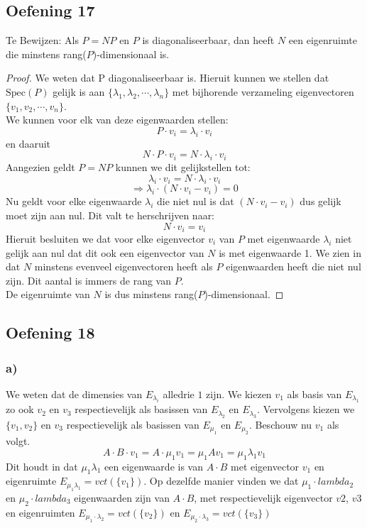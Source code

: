 \documentclass[lineaire_algebra_oplossingen.tex]{subfiles}
\begin{document}
\subsection{Oefening 17}

Te Bewijzen:
Als $P = NP$ en $P$ is diagonaliseerbaar, dan heeft $N$ een eigenruimte die minstens rang($P$)-dimensionaal is.
\begin{proof}
We weten dat P diagonaliseerbaar is. Hieruit kunnen we stellen dat $\text{Spec}(P)$ gelijk is aan $\{\lambda_1, \lambda_2,\cdots,\lambda_n\}$ met bijhorende verzameling eigenvectoren $\{v_1, v_2,\cdots,v_n\}$.\\
We kunnen voor elk van deze eigenwaarden stellen:
\[P \cdot v_i = \lambda_i \cdot v_i\]
en daaruit
\[N \cdot P \cdot v_i = N \cdot \lambda_i \cdot v_i\]
Aangezien geldt $P=NP$ kunnen we dit gelijkstellen tot:
\[\lambda_i \cdot v_i = N \cdot \lambda_i \cdot v_i\]
\[\Rightarrow \lambda_i \cdot (N \cdot v_i - v_i) = 0\]
Nu geldt voor elke eigenwaarde $\lambda_i$ die niet nul is dat $(N \cdot v_i - v_i)$ dus gelijk moet zijn aan nul. Dit valt te herschrijven naar:
\[N \cdot v_i = v_i\]
Hieruit besluiten we dat voor elke eigenvector $v_i$ van $P$ met eigenwaarde $\lambda_i$ niet gelijk aan nul dat dit ook een eigenvector van $N$ is met eigenwaarde 1.
We zien in dat $N$ minstens evenveel eigenvectoren heeft als $P$ eigenwaarden heeft die niet nul zijn. Dit aantal is immers de rang van $P$. \\
De eigenruimte van $N$ is dus minstens rang($P$)-dimensionaal.
\end{proof}


\subsection{Oefening 18}
\subsubsection*{a)}
We weten dat de dimensies van $E_{\lambda_i}$ alledrie $1$ zijn.
We kiezen $v_1$ als basis van $E_{\lambda_1}$ zo ook $v_2$ en $v_3$ respectievelijk als basissen van $E_{\lambda_2}$ en $E_{\lambda_3}$.
Vervolgens kiezen we $\{v_1,v_2\}$ en $v_3$ respectievelijk als basissen van $E_{\mu_1}$ en $E_{\mu_2}$.
Beschouw nu $v_1$ als volgt.
\[
A\cdot B\cdot v_1 = A\cdot\mu_1v_1 = \mu_1Av_1= \mu_1\lambda_1v_1
\]
Dit houdt in dat $\mu_1\lambda_1$ een eigenwaarde is van $A\cdot B$ met eigenvector $v_1$ en eigenruimte $E_{\mu_1\lambda_1} = vct(\{v_1\})$. Op dezelfde manier vinden we dat $\mu_1 \cdot lambda_2$ en $\mu_2 \cdot lambda_3$ eigenwaarden zijn van $A\cdot B$, met respectievelijk eigenvector $v2$, $v3$ en eigenruimten $E_{\mu_1 \cdot \lambda_2} = vct(\{v_2\})$ en $E_{\mu_2 \cdot \lambda_3} = vct(\{v_3\})$
\end{document}

